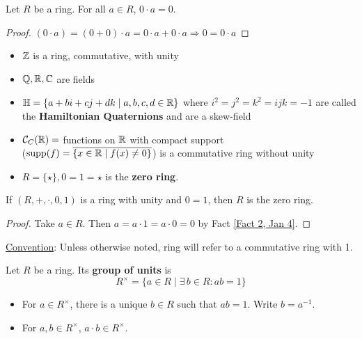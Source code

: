 \begin{fact}\label{Fact 2, Jan 4}
 Let $R$ be a ring. For all $a \in R$, $0 \cdot a = 0$.
\end{fact}
\begin{proof}
    $(0 \cdot a) = (0 + 0) \cdot a = 0 \cdot a + 0 \cdot a \Rightarrow 0 = 0 \cdot a$
\end{proof}
\begin{ex} \hspace{0.5cm}
    \begin{itemize}
        \item $\mathbb{Z}$ is a ring, commutative, with unity
        \item $\mathbb{Q}, \mathbb{R}, \mathbb{C}$ are fields
        \item $\mathbb{H} = \{a + bi + cj + dk \mid a,b,c,d \in \mathbb{R} \}$ where $i^2 = j^2 = k^2 = ijk = -1$ are
        called the \textbf{Hamiltonian Quaternions} and are a skew-field
        \item $\mathcal{C}_{C}(\mathbb{R}) = $ functions on $\mathbb{R}$ with compact
        support \\
        ($\operatorname{supp}(f) = \overline{\{x \in \mathbb{R} \mid f(x) \neq 0\}}$) is a
        commutative ring without unity
        \item $R = \{\star\}, 0 = 1 = \star$ is the \textbf{zero ring}.
    \end{itemize}
\end{ex}
\begin{fact} \label{Fact 3, Jan 4}
    If $(R,+,\cdot,0,1)$ is a ring with unity and $0 = 1$, then $R$ is the zero ring.
\end{fact}
\begin{proof}
    Take $a \in R$. Then $a = a \cdot 1 = a \cdot 0 = 0$ by Fact \ref{Fact 2, Jan 4}.
\end{proof}
\noindent \underline{Convention}: Unless otherwise noted, ring will refer to
a commutative ring with 1.
\begin{defn} \label{Defn 4, Jan 4}
    Let $R$ be a ring. Its \textbf{group of units} is
    $$
    R^\times = \{a \in R \mid \exists \, b \in R: ab = 1\}
    $$
\end{defn}
\begin{fact} \label{Fact 5, Jan 4} \hspace{0.5cm}
    \begin{itemize}
        \item For $a \in R^\times$, there is a unique $b \in R$ such that $ab = 1$.
        Write $b = a^{-1}$.
        \item For $a,b \in R^\times$, $a \cdot b \in R^\times$.
    \end{itemize}
\end{fact}
